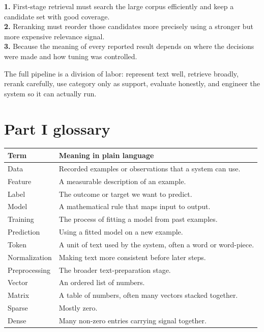 \documentclass[11pt,oneside]{report}
\begin{document}
\begin{answerbox}
\textbf{1.} First-stage retrieval must search the large corpus efficiently and keep a candidate set with good coverage.\\
\textbf{2.} Reranking must reorder those candidates more precisely using a stronger but more expensive relevance signal.\\
\textbf{3.} Because the meaning of every reported result depends on where the decisions were made and how tuning was controlled.
\end{answerbox}

\begin{rememberbox}
The full pipeline is a division of labor: represent text well, retrieve broadly, rerank carefully, use category only as support, evaluate honestly, and engineer the system so it can actually run.
\end{rememberbox}



\chapter*{Part I glossary}
\begin{longtable}{p{}p{}}
\toprule
\textbf{Term} & \textbf{Meaning in plain language} \\ \midrule
Data & Recorded examples or observations that a system can use. \\ \midrule
Feature & A measurable description of an example. \\ \midrule
Label & The outcome or target we want to predict. \\ \midrule
Model & A mathematical rule that maps input to output. \\ \midrule
Training & The process of fitting a model from past examples. \\ \midrule
Prediction & Using a fitted model on a new example. \\ \midrule
Token & A unit of text used by the system, often a word or word-piece. \\ \midrule
Normalization & Making text more consistent before later steps. \\ \midrule
Preprocessing & The broader text-preparation stage. \\ \midrule
Vector & An ordered list of numbers. \\ \midrule
Matrix & A table of numbers, often many vectors stacked together. \\ \midrule
Sparse & Mostly zero. \\ \midrule
Dense & Many non-zero entries carrying signal together. \\
\bottomrule
\end{longtable}
\end{document}
